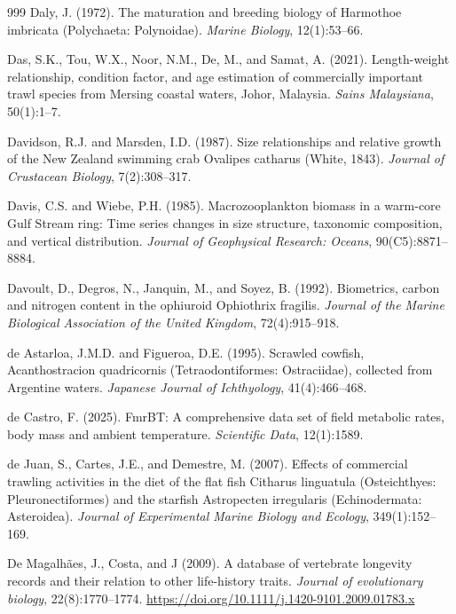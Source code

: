 \begin{thebibliography}{999}
Daly, J. (1972). The maturation and breeding biology of Harmothoe imbricata (Polychaeta: Polynoidae). \textit{Marine Biology}, 12(1):53--66.

Das, S.K., Tou, W.X., Noor, N.M., De, M., and Samat, A. (2021). Length-weight relationship, condition factor, and age estimation of commercially important trawl species from Mersing coastal waters, Johor, Malaysia. \textit{Sains Malaysiana}, 50(1):1--7.

Davidson, R.J. and Marsden, I.D. (1987). Size relationships and relative growth of the New Zealand swimming crab Ovalipes catharus (White, 1843). \textit{Journal of Crustacean Biology}, 7(2):308--317.

Davis, C.S. and Wiebe, P.H. (1985). Macrozooplankton biomass in a warm-core Gulf Stream ring: Time series changes in size structure, taxonomic composition, and vertical distribution. \textit{Journal of Geophysical Research: Oceans}, 90(C5):8871--8884.

Davoult, D., Degros, N., Janquin, M., and Soyez, B. (1992). Biometrics, carbon and nitrogen content in the ophiuroid Ophiothrix fragilis. \textit{Journal of the Marine Biological Association of the United Kingdom}, 72(4):915--918.

de Astarloa, J.M.D. and Figueroa, D.E. (1995). Scrawled cowfish, Acanthostracion quadricornis (Tetraodontiformes: Ostraciidae), collected from Argentine waters. \textit{Japanese Journal of Ichthyology}, 41(4):466--468.

de Castro, F. (2025). FmrBT: A comprehensive data set of field metabolic rates, body mass and ambient temperature. \textit{Scientific Data}, 12(1):1589.

de Juan, S., Cartes, J.E., and Demestre, M. (2007). Effects of commercial trawling activities in the diet of the flat fish Citharus linguatula (Osteichthyes: Pleuronectiformes) and the starfish Astropecten irregularis (Echinodermata: Asteroidea). \textit{Journal of Experimental Marine Biology and Ecology}, 349(1):152--169.

De Magalh{\~a}es, J., Costa, and J (2009). A database of vertebrate longevity records and their relation to other life-history traits. \textit{Journal of evolutionary biology}, 22(8):1770--1774. \url{https://doi.org/10.1111/j.1420-9101.2009.01783.x}


\end{thebibliography}
